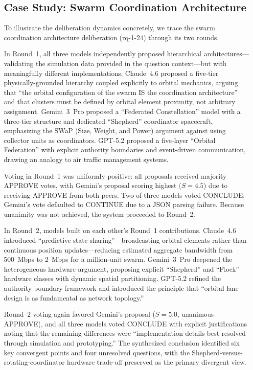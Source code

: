 \documentclass[11pt,a4paper]{article}
\begin{document}
\subsection{Case Study: Swarm Coordination Architecture}

To illustrate the deliberation dynamics concretely, we trace the swarm coordination architecture deliberation (rq-1-24) through its two rounds.

In Round~1, all three models independently proposed hierarchical architectures---validating the simulation data provided in the question context---but with meaningfully different implementations. Claude~4.6 proposed a five-tier physically-grounded hierarchy coupled explicitly to orbital mechanics, arguing that ``the orbital configuration of the swarm IS the coordination architecture'' and that clusters must be defined by orbital element proximity, not arbitrary assignment. Gemini~3~Pro proposed a ``Federated Constellation'' model with a three-tier structure and dedicated ``Shepherd'' coordinator spacecraft, emphasizing the SWaP (Size, Weight, and Power) argument against using collector units as coordinators. GPT-5.2 proposed a five-layer ``Orbital Federation'' with explicit authority boundaries and event-driven communication, drawing an analogy to air traffic management systems.

Voting in Round~1 was uniformly positive: all proposals received majority APPROVE votes, with Gemini's proposal scoring highest ($S = 4.5$) due to receiving APPROVE from both peers. Two of three models voted CONCLUDE; Gemini's vote defaulted to CONTINUE due to a JSON parsing failure. Because unanimity was not achieved, the system proceeded to Round~2.

In Round~2, models built on each other's Round~1 contributions. Claude~4.6 introduced ``predictive state sharing''---broadcasting orbital elements rather than continuous position updates---reducing estimated aggregate bandwidth from 500~Mbps to 2~Mbps for a million-unit swarm. Gemini~3~Pro deepened the heterogeneous hardware argument, proposing explicit ``Shepherd'' and ``Flock'' hardware classes with dynamic spatial partitioning. GPT-5.2 refined the authority boundary framework and introduced the principle that ``orbital lane design is as fundamental as network topology.''

Round~2 voting again favored Gemini's proposal ($S = 5.0$, unanimous APPROVE), and all three models voted CONCLUDE with explicit justifications noting that the remaining differences were ``implementation details best resolved through simulation and prototyping.'' The synthesized conclusion identified six key convergent points and four unresolved questions, with the Shepherd-versus-rotating-coordinator hardware trade-off preserved as the primary divergent view.
\end{document}
